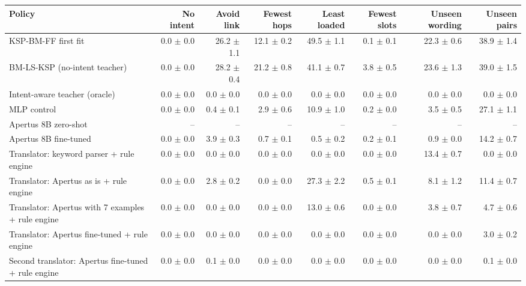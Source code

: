 \begin{tabular}{lrrrrrrr}
\toprule
Policy & No intent & Avoid link & Fewest hops & Least loaded & Fewest slots & Unseen wording & Unseen pairs \\
\midrule
KSP-BM-FF first fit & 0.0 $\pm$ 0.0 & 26.2 $\pm$ 1.1 & 12.1 $\pm$ 0.2 & 49.5 $\pm$ 1.1 & 0.1 $\pm$ 0.1 & 22.3 $\pm$ 0.6 & 38.9 $\pm$ 1.4 \\
BM-LS-KSP (no-intent teacher) & 0.0 $\pm$ 0.0 & 28.2 $\pm$ 0.4 & 21.2 $\pm$ 0.8 & 41.1 $\pm$ 0.7 & 3.8 $\pm$ 0.5 & 23.6 $\pm$ 1.3 & 39.0 $\pm$ 1.5 \\
Intent-aware teacher (oracle) & 0.0 $\pm$ 0.0 & 0.0 $\pm$ 0.0 & 0.0 $\pm$ 0.0 & 0.0 $\pm$ 0.0 & 0.0 $\pm$ 0.0 & 0.0 $\pm$ 0.0 & 0.0 $\pm$ 0.0 \\
MLP control & 0.0 $\pm$ 0.0 & 0.4 $\pm$ 0.1 & 2.9 $\pm$ 0.6 & 10.9 $\pm$ 1.0 & 0.2 $\pm$ 0.0 & 3.5 $\pm$ 0.5 & 27.1 $\pm$ 1.1 \\
Apertus 8B zero-shot & -- & -- & -- & -- & -- & -- & -- \\
Apertus 8B fine-tuned & 0.0 $\pm$ 0.0 & 3.9 $\pm$ 0.3 & 0.7 $\pm$ 0.1 & 0.5 $\pm$ 0.2 & 0.2 $\pm$ 0.1 & 0.9 $\pm$ 0.0 & 14.2 $\pm$ 0.7 \\
Translator: keyword parser + rule engine & 0.0 $\pm$ 0.0 & 0.0 $\pm$ 0.0 & 0.0 $\pm$ 0.0 & 0.0 $\pm$ 0.0 & 0.0 $\pm$ 0.0 & 13.4 $\pm$ 0.7 & 0.0 $\pm$ 0.0 \\
Translator: Apertus as is + rule engine & 0.0 $\pm$ 0.0 & 2.8 $\pm$ 0.2 & 0.0 $\pm$ 0.0 & 27.3 $\pm$ 2.2 & 0.5 $\pm$ 0.1 & 8.1 $\pm$ 1.2 & 11.4 $\pm$ 0.7 \\
Translator: Apertus with 7 examples + rule engine & 0.0 $\pm$ 0.0 & 0.0 $\pm$ 0.0 & 0.0 $\pm$ 0.0 & 13.0 $\pm$ 0.6 & 0.0 $\pm$ 0.0 & 3.8 $\pm$ 0.7 & 4.7 $\pm$ 0.6 \\
Translator: Apertus fine-tuned + rule engine & 0.0 $\pm$ 0.0 & 0.0 $\pm$ 0.0 & 0.0 $\pm$ 0.0 & 0.0 $\pm$ 0.0 & 0.0 $\pm$ 0.0 & 0.0 $\pm$ 0.0 & 3.0 $\pm$ 0.2 \\
Second translator: Apertus fine-tuned + rule engine & 0.0 $\pm$ 0.0 & 0.1 $\pm$ 0.0 & 0.0 $\pm$ 0.0 & 0.0 $\pm$ 0.0 & 0.0 $\pm$ 0.0 & 0.0 $\pm$ 0.0 & 0.1 $\pm$ 0.0 \\
\bottomrule
\end{tabular}

